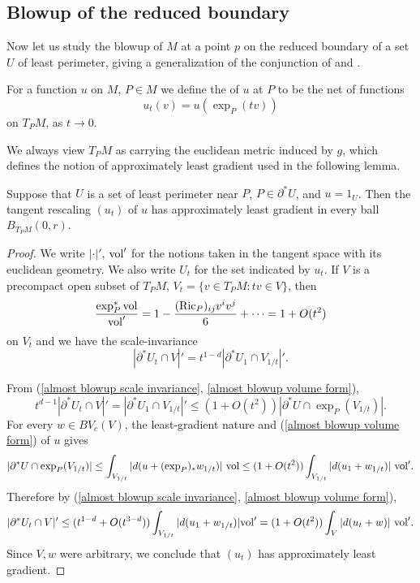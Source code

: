\subsection{Blowup of the reduced boundary}
Now let us study the blowup of $M$ at a point $p$ on the reduced boundary of a set $U$ of least perimeter, giving a generalization of the conjunction of \cite[Theorem 9.3]{Giusti77} and \cite[Theorem 6.2.2]{Simons68}.

\begin{definition}
For a function $u$ on $M$, $P \in M$ we define the  of $u$ at $P$ to be the net of functions
$$u_t(v) = u\left(\exp_P(tv)\right)$$
on $T_PM$, as $t \to 0$.
\end{definition}

We always view $T_PM$ as carrying the euclidean metric induced by $g$, which defines the notion of approximately least gradient used in the following lemma.

\begin{lemma}\label{almost blowup theorem}
Suppose that $U$ is a set of least perimeter near $P$, $P \in \partial^* U$, and $u = 1_U$.
Then the tangent rescaling $(u_t)$ of $u$ has approximately least gradient in every ball $B_{T_PM}(0, r)$.
\end{lemma}
\begin{proof}
We write $|\cdot|'$, $\mathrm{vol}'$ for the notions taken in the tangent space with its euclidean geometry.
We also write $U_t$ for the set indicated by $u_t$.
If $V$ is a precompact open subset of $T_PM$, $V_t = \{v \in T_PM: tv \in V\}$, then
\begin{equation}\label{almost blowup volume form}
\frac{\exp_P^* \mathrm{vol}}{\mathrm{vol}'} = 1 - \frac{(\mathrm{Ric}_P)_{ij}v^iv^j}{6} + \cdots = 1 + O(t^2)
\end{equation}
on $V_t$ and we have the scale-invariance
\begin{equation}\label{almost blowup scale invariance}
|\partial^* U_t \cap V|' = t^{1 - d}|\partial^* U_1 \cap V_{1/t}|'.
\end{equation}

From (\ref{almost blowup scale invariance}, \ref{almost blowup volume form}),
$$t^{d - 1} |\partial^* U_t \cap V|' = |\partial^* U_1 \cap V_{1/t}|' \leq (1 + O(t^2)) |\partial^* U \cap \exp_P(V_{1/t})|.$$
For every $w \in BV_c(V)$, the least-gradient nature and (\ref{almost blowup volume form}) of $u$ gives
$$|\partial^* U \cap \exp_P(V_{1/t})| \leq \int_{V_{1/t}} |d(u + (\exp_P)_* w_{1/t})| ~\mathrm{vol} \leq (1 + O(t^2))\int_{V_{1/t}} |d(u_1 + w_{1/t})| ~\mathrm{vol}'.$$
Therefore by (\ref{almost blowup scale invariance}, \ref{almost blowup volume form}),
$$|\partial^* U_t \cap V|' \leq (t^{1 - d} + O(t^{3 - d})) \int_{V_{1/t}} |d(u_1 + w_{1/t})| \mathrm{vol}' = (1 + O(t^2)) \int_V |d(u_t + w)| ~\mathrm{vol}'.$$
Since $V,w$ were arbitrary, we conclude that $(u_t)$ has approximately least gradient.
\end{proof}


